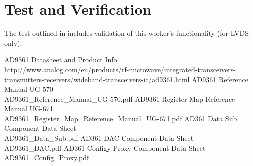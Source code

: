 \documentclass{article}
\begin{document}
\section*{Test and Verification}
The test outlined in \cite{dac_comp_datasheet} includes validation of this worker's functionality (for LVDS only).
\pagebreak
\begin{thebibliography}{1}

 AD9361 Datasheet and Product Info \\
\url{http://www.analog.com/en/products/rf-microwave/integrated-transceivers-transmitters-receivers/wideband-transceivers-ic/ad9361.html}
 AD9361 Reference Manual UG-570\\
AD9361\_Reference\_Manual\_UG-570.pdf
 AD9361 Register Map Reference Manual UG-671\\
AD9361\_Register\_Map\_Reference\_Manual\_UG-671.pdf
 AD361 Data Sub Component Data Sheet \\AD9361\_Data\_Sub.pdf
 AD361 DAC Component Data Sheet \\AD9361\_DAC.pdf
 AD361 Configy Proxy Component Data Sheet \\AD9361\_Config\_Proxy.pdf

\end{thebibliography}
\pagebreak
\end{document}
